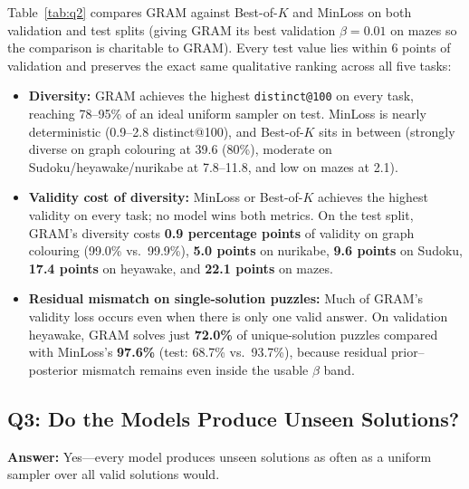 \documentclass[11pt]{article}
\newcommand{\Bok}{Best-of-$K$}
\begin{document}
Table~\ref{tab:q2} compares GRAM against \Bok{} and MinLoss on both validation and test splits (giving GRAM its best validation $\beta=0.01$ on mazes so the comparison is charitable to GRAM). Every test value lies within 6 points of validation and preserves the exact same qualitative ranking across all five tasks:
\begin{itemize}
  \item \textbf{Diversity:} GRAM achieves the highest \texttt{distinct@100} on every task, reaching 78--95\% of an ideal uniform sampler on test. MinLoss is nearly deterministic (0.9--2.8 distinct@100), and \Bok{} sits in between (strongly diverse on graph colouring at 39.6 (80\%), moderate on Sudoku/heyawake/nurikabe at 7.8--11.8, and low on mazes at 2.1).
  \item \textbf{Validity cost of diversity:} MinLoss or \Bok{} achieves the highest validity on every task; no model wins both metrics. On the test split, GRAM's diversity costs \textbf{0.9 percentage points} of validity on graph colouring (99.0\% vs.\ 99.9\%), \textbf{5.0 points} on nurikabe, \textbf{9.6 points} on Sudoku, \textbf{17.4 points} on heyawake, and \textbf{22.1 points} on mazes.
  \item \textbf{Residual mismatch on single-solution puzzles:} Much of GRAM's validity loss occurs even when there is only one valid answer. On validation heyawake, GRAM solves just \textbf{72.0\%} of unique-solution puzzles compared with MinLoss's \textbf{97.6\%} (test: 68.7\% vs.\ 93.7\%), because residual prior--posterior mismatch remains even inside the usable $\beta$ band.
\end{itemize}

\subsection{Q3: Do the Models Produce Unseen Solutions?}
\textbf{Answer:} Yes---every model produces unseen solutions as often as a uniform sampler over all valid solutions would.
\end{document}

